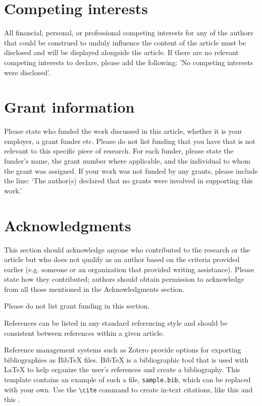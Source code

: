 \documentclass[9pt,a4paper]{extarticle}
\begin{document}
\section*{Competing interests}
All financial, personal, or professional competing interests for any of the authors that
could be construed to unduly influence the content of the article must be disclosed and will be displayed alongside the article. If there are no relevant competing interests to declare, please add the following: 'No competing interests were disclosed'.

\section*{Grant information}
Please state who funded the work discussed in this article, whether it is your employer, a grant funder etc. Please do not list funding that you have that is not relevant to this
specific piece of research. For each funder, please state the funder’s name, the grant
number where applicable, and the individual to whom the grant was assigned.
If your work was not funded by any grants, please include the line: ‘The author(s)
declared that no grants were involved in supporting this work.’

\section*{Acknowledgments}
This section should acknowledge anyone who contributed to the research or the
article but who does not qualify as an author based on the criteria provided earlier
(e.g. someone or an organization that provided writing assistance). Please state how
they contributed; authors should obtain permission to acknowledge from all those
mentioned in the Acknowledgments section.

Please do not list grant funding in this section.


{\small
}

\bigskip
References can be listed in any standard referencing style and should be consistent between references within a given article.

Reference management systems such as Zotero provide options for exporting bibliographies as Bib\TeX{} files. Bib\TeX{} is a bibliographic tool that is used with \LaTeX{} to help organize the user's references and create a bibliography. This template contains an example of such a file, \texttt{sample.bib}, which can be replaced with your own. Use the \verb|\cite| command  to create in-text citations, like this \cite{Smith:2012qr} and this \cite{Smith:2013jd}.
\end{document}

